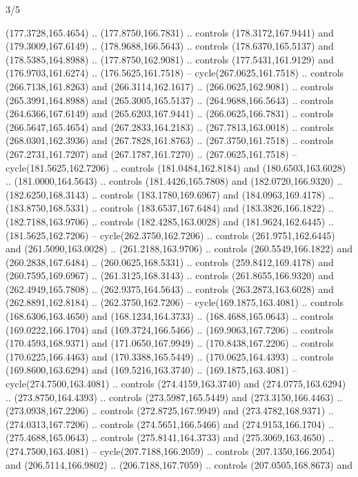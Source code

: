 \begin{flagdescription}{3/5}
\begin{scope}[scale=0.00214\flagwidth,yshift=162mm]
\begin{scope}[y=-0.8pt, x=0.8pt, inner sep=0pt, outer sep=0pt]
\begin{scope}[draw,fill=gold,line join=round,line cap=round,line width=0.0025\flagwidth]
\begin{scope}[line width=0.0025\flagwidth]
(177.3728,165.4654) .. (177.8750,166.7831) .. controls (178.3172,167.9441) and
(179.3009,167.6149) .. (178.9688,166.5643) .. controls (178.6370,165.5137) and
(178.5385,164.8988) .. (177.8750,162.9081) .. controls (177.5431,161.9129) and
(176.9703,161.6274) .. (176.5625,161.7518) -- cycle(267.0625,161.7518) ..
controls (266.7138,161.8263) and (266.3114,162.1617) .. (266.0625,162.9081) ..
controls (265.3991,164.8988) and (265.3005,165.5137) .. (264.9688,166.5643) ..
controls (264.6366,167.6149) and (265.6203,167.9441) .. (266.0625,166.7831) ..
controls (266.5647,165.4654) and (267.2833,164.2183) .. (267.7813,163.0018) ..
controls (268.0301,162.3936) and (267.7828,161.8763) .. (267.3750,161.7518) ..
controls (267.2731,161.7207) and (267.1787,161.7270) .. (267.0625,161.7518) --
cycle(181.5625,162.7206) .. controls (181.0484,162.8184) and
(180.6503,163.6028) .. (181.0000,164.5643) .. controls (181.4426,165.7808) and
(182.0720,166.9320) .. (182.6250,168.3143) .. controls (183.1780,169.6967) and
(184.0963,169.4178) .. (183.8750,168.5331) .. controls (183.6537,167.6484) and
(183.3826,166.1822) .. (182.7188,163.9706) .. controls (182.4285,163.0028) and
(181.9624,162.6445) .. (181.5625,162.7206) -- cycle(262.3750,162.7206) ..
controls (261.9751,162.6445) and (261.5090,163.0028) .. (261.2188,163.9706) ..
controls (260.5549,166.1822) and (260.2838,167.6484) .. (260.0625,168.5331) ..
controls (259.8412,169.4178) and (260.7595,169.6967) .. (261.3125,168.3143) ..
controls (261.8655,166.9320) and (262.4949,165.7808) .. (262.9375,164.5643) ..
controls (263.2873,163.6028) and (262.8891,162.8184) .. (262.3750,162.7206) --
cycle(169.1875,163.4081) .. controls (168.6306,163.4650) and
(168.1234,164.3733) .. (168.4688,165.0643) .. controls (169.0222,166.1704) and
(169.3724,166.5466) .. (169.9063,167.7206) .. controls (170.4593,168.9371) and
(171.0650,167.9949) .. (170.8438,167.2206) .. controls (170.6225,166.4463) and
(170.3388,165.5449) .. (170.0625,164.4393) .. controls (169.8600,163.6294) and
(169.5216,163.3740) .. (169.1875,163.4081) -- cycle(274.7500,163.4081) ..
controls (274.4159,163.3740) and (274.0775,163.6294) .. (273.8750,164.4393) ..
controls (273.5987,165.5449) and (273.3150,166.4463) .. (273.0938,167.2206) ..
controls (272.8725,167.9949) and (273.4782,168.9371) .. (274.0313,167.7206) ..
controls (274.5651,166.5466) and (274.9153,166.1704) .. (275.4688,165.0643) ..
controls (275.8141,164.3733) and (275.3069,163.4650) .. (274.7500,163.4081) --
cycle(207.7188,166.2059) .. controls (207.1350,166.2054) and
(206.5114,166.9802) .. (206.7188,167.7059) .. controls (207.0505,168.8673) and

\end{scope}
\end{scope}
\end{scope}
\end{scope}
\end{flagdescription}
